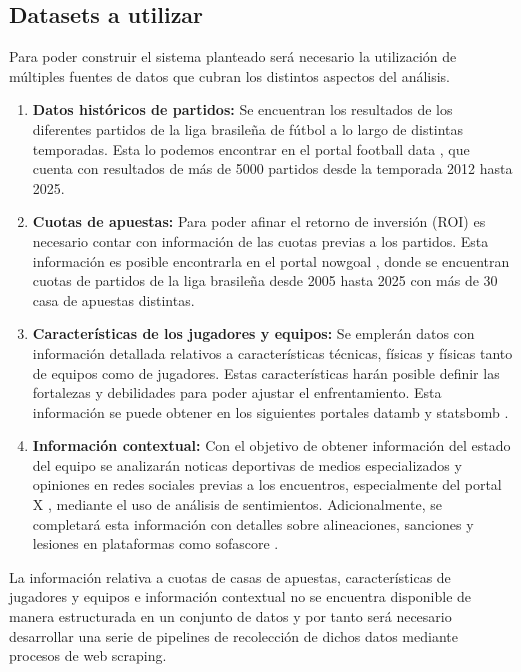 \subsection{Datasets a utilizar}

Para poder construir el sistema planteado será necesario la utilización de múltiples fuentes de datos que cubran los distintos aspectos del análisis.

\begin{enumerate}
    \item \textbf{Datos históricos de partidos:} Se encuentran los resultados de los diferentes partidos de la liga brasileña de fútbol a lo largo de distintas temporadas. Esta lo podemos encontrar en el portal football data \cite{footballData} \cite{holmesForecastingFootballMatch2024}, que cuenta con resultados de más de 5000 partidos desde la temporada 2012 hasta 2025.

    \item \textbf{Cuotas de apuestas:} Para poder afinar el retorno de inversión (ROI) es necesario contar con información de las cuotas previas a los partidos. Esta información es posible encontrarla en el portal nowgoal \cite{nowgoalOdds}, donde se encuentran cuotas de partidos de la liga brasileña desde 2005 hasta 2025 con más de 30 casa de apuestas distintas.
    
    \item \textbf{Características de los jugadores y equipos:} Se emplerán datos con información detallada relativos a características técnicas, físicas y físicas tanto de equipos como de jugadores. Estas características harán posible definir las fortalezas y debilidades para poder ajustar el enfrentamiento. Esta información se puede obtener en los siguientes portales datamb \cite{datamb} y statsbomb \cite{statsbomb}.
    \item \textbf{Información contextual:} Con el objetivo de obtener información del estado del equipo se analizarán noticas deportivas de medios especializados y opiniones en redes sociales previas a los encuentros, especialmente del portal X \cite{twitter}, mediante el uso de análisis de sentimientos. Adicionalmente, se completará esta información con detalles sobre alineaciones, sanciones y lesiones en plataformas como sofascore \cite{sofascore}.
\end{enumerate}


La información relativa a cuotas de casas de apuestas, características de jugadores y equipos e información contextual no se encuentra disponible de manera estructurada en un conjunto de datos y por tanto será necesario desarrollar una serie de pipelines de recolección de dichos datos mediante procesos de web scraping. 


